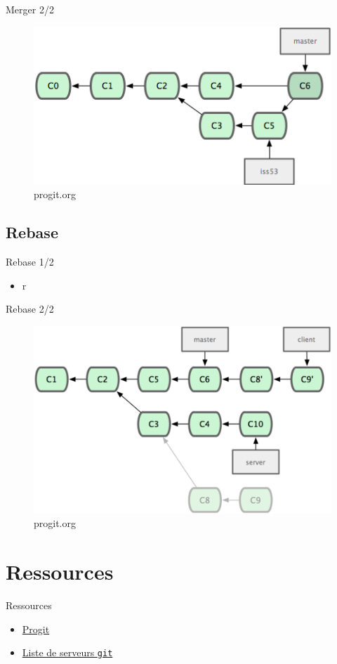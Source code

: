 \documentclass{beamer}
\newcommand{\git}{\texttt{git}}
\begin{document}
\begin{frame}{Merger 2/2}
  \begin{figure}
    \begin{center}
      \includegraphics[scale=0.7]{img/Merge.png}
    \end{center}
    \caption{progit.org}
  \end{figure}
\end{frame}

\subsection*{Rebase}
\begin{frame}{Rebase 1/2}
  \begin{itemize}
  \item r
  \end{itemize}
\end{frame}

\begin{frame}{Rebase 2/2}
  \begin{figure}
    \begin{center}
      \includegraphics[scale=0.7]{img/Rebase.png}
    \end{center}
    \caption{progit.org}
  \end{figure}
\end{frame}

\section{Ressources}
\begin{frame}{Ressources}
  \begin{itemize}
  \item \href{http://progit.org/about.html}{Progit}
  \item \href{http://git.or.cz/gitwiki/GitHosting}{Liste de serveurs \git}
  \end{itemize}
\end{frame}
\end{document}
